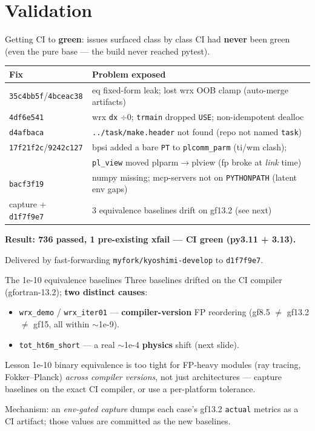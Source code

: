 \documentclass[10pt,aspectratio=169]{beamer}
\newcommand{\C}[1]{\texttt{\small #1}}          %
\newcommand{\good}{\textcolor{ok}{\textbf{green}}}
\begin{document}
\section{Validation}
\begin{frame}{Getting CI to \good: issues surfaced class by class}
CI had \textbf{never} been green (even the pure base --- the build never reached pytest).
\begin{table}\scriptsize
\begin{tabular}{@{}ll@{}}
\toprule
Fix & Problem exposed \\
\midrule
\C{35c4bb5f}/\C{4bceac38} & eq fixed-form leak; lost wrx OOB clamp (auto-merge artifacts) \\
\C{4df6e541} & wrx \C{dx} $\div 0$; \C{trmain} dropped \C{USE}; non-idempotent dealloc \\
\C{d4afbaca} & \C{../task/make.header} not found (repo not named \C{task}) \\
\C{17f21f2c}/\C{9242c127} & bpsi added a bare \C{PT} to \C{plcomm\_parm} (ti/wm clash); \\
                          & \C{pl\_view} moved plparm$\to$plview (fp broke at \emph{link} time) \\
\C{bacf3f19} & numpy missing; mcp-servers not on \C{PYTHONPATH} (latent env gaps) \\
capture + \C{d1f7f9e7} & 3 equivalence baselines drift on gf13.2 (see next) \\
\bottomrule
\end{tabular}
\end{table}
\begin{center}\textbf{Result: 736 passed, 1 pre-existing xfail --- CI \good{} (py3.11 + 3.13).}\end{center}
Delivered by fast-forwarding \C{myfork/kyoshimi-develop} to \C{d1f7f9e7}.
\end{frame}

\begin{frame}{The 1e-10 equivalence baselines}
Three baselines drifted on the CI compiler (gfortran-13.2); \textbf{two distinct causes}:
\begin{itemize}
\item \C{wrx\_demo} / \C{wrx\_iter01} --- \textbf{compiler-version} FP reordering
      (gf8.5 $\ne$ gf13.2 $\ne$ gf15, all within $\sim$1e-9).
\item \C{tot\_ht6m\_short} --- a real $\sim$1e-4 \textbf{physics} shift (next slide).
\end{itemize}
\begin{alertblock}{Lesson}
1e-10 binary equivalence is too tight for FP-heavy modules (ray tracing, Fokker--Planck)
\emph{across compiler versions}, not just architectures --- capture baselines on the exact CI
compiler, or use a per-platform tolerance.
\end{alertblock}
Mechanism: an \emph{env-gated capture} dumps each case's gf13.2 \C{actual} metrics as a CI artifact;
those values are committed as the new baselines.
\end{frame}
\end{document}
